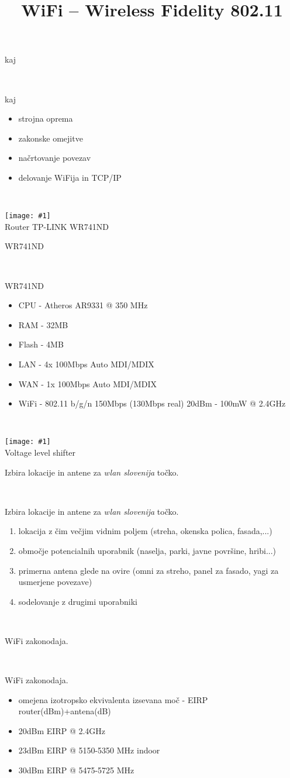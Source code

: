 \documentclass[]{beamer}
\title{WiFi -- Wireless Fidelity 802.11}
\date[]{}
\newcommand{\wlanslovenija}{\emph{wlan slovenija }}
\newcommand{\ifstrempty}[3]{%
\def\reallyempty{}%
\def\ifarg{#1}%
\ifx\ifarg\reallyempty%
{#2}
\else
{#3}
\fi%
}
\newcommand{\wrapframe}[1]{
\begin{frame}
 #1
\end{frame}
}
\newcommand{\simpleslide}[3]{\wrapframe{
\ifstrempty{#1}{\vbox{ \ } 

}{
{\footnotesize #1}
} \vfill

\begin{center}
#2
\end{center}
\vfill
\ifstrempty{#3}{ \ }{
\begin{flushright}
{\footnotesize #3}
\end{flushright}
}
}}
\newcommand{\simpleslideimage}[2]{\wrapframe{
\begin{center}
\texttt{[image: \#1]}
\\ {\footnotesize #2}
\end{center}}
}
\begin{document}
\maketitle

\simpleslide{kaj}{
\begin{itemize}
\item strojna oprema
\item zakonske omejitve
\item načrtovanje povezav
\item delovanje WiFija in TCP/IP
\end{itemize}
}{}

\simpleslideimage{clipart/wr741nd-4v20-4.jpg}{Router TP-LINK WR741ND}

\simpleslide{WR741ND}{
\begin{itemize}
\item CPU - Atheros AR9331 @ 350 MHz
\item RAM - 32MB
\item Flash - 4MB
\item LAN - 4x 100Mbps Auto MDI/MDIX
\item WAN - 1x 100Mbps Auto MDI/MDIX
\item WiFi - 802.11 b/g/n 150Mbps (130Mbps real) 20dBm - 100mW @ 2.4GHz
\end{itemize}
}{}

\simpleslideimage{clipart/TP-LINK-serial.pdf}{Voltage level shifter}

\simpleslide{Izbira lokacije in antene za \wlanslovenija točko. }{
\begin{enumerate}
\item lokacija z čim večjim vidnim poljem (streha, okenska polica, fasada,...)
\item območje potencialnih uporabnik (naselja, parki, javne površine, hribi...)
\item primerna antena glede na ovire (omni za streho, panel za fasado, yagi za usmerjene povezave)
\item sodelovanje z drugimi uporabniki
\end{enumerate}
}{}

\simpleslide{WiFi zakonodaja.}{
\begin{itemize}
\item omejena izotropsko ekvivalenta izsevana moč - EIRP router(dBm)+antena(dB)
\item 20dBm EIRP @ 2.4GHz
\item 23dBm EIRP @ 5150-5350 MHz indoor
\item 30dBm EIRP @ 5475-5725 MHz
\end{itemize}
}{}
\end{document}
